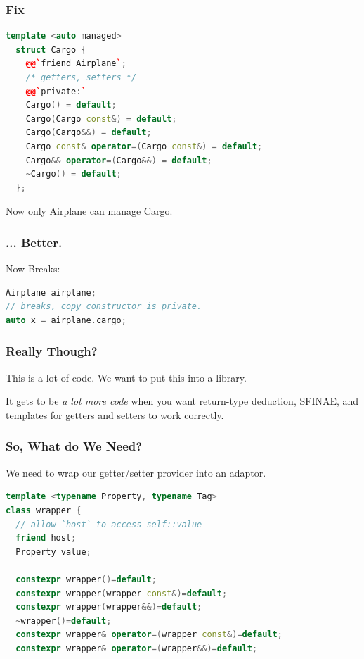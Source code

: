 \documentclass{beamer}
\newcommand{\nl}{\vspace{0.2\baselineskip}}
\begin{document}
\begin{frame}[fragile]
\frametitle{Fix}
\begin{lstlisting}[language=cpp]
  template <auto managed>
  struct Cargo {
    @@`friend Airplane`;
    /* getters, setters */
    @@`private:`
    Cargo() = default;
    Cargo(Cargo const&) = default;
    Cargo(Cargo&&) = default;
    Cargo const& operator=(Cargo const&) = default;
    Cargo&& operator=(Cargo&&) = default;
    ~Cargo() = default;
  };
\end{lstlisting}
\begin{center}
  Now only Airplane can manage Cargo.
\end{center}
\end{frame}


\begin{frame}[fragile]
\frametitle{... Better.}
\begin{center}
  Now Breaks:
\end{center}

\begin{lstlisting}[language=cpp]
Airplane airplane;
// breaks, copy constructor is private.
auto x = airplane.cargo;
\end{lstlisting}
\end{frame}

\begin{frame}[fragile]
\frametitle{Really Though?}
\begin{center}
  This is a lot of code. We want to put this into a library.\nl \nl \nl \nl

  It gets to be \emph{a lot more code} when you want return-type deduction,
  SFINAE, and templates for getters and setters to work correctly.
\end{center}
\end{frame}

\begin{frame}[fragile]
\frametitle{So, What do We Need?}
\begin{center}
  We need to wrap our getter/setter provider into an adaptor.
\end{center}
\begin{lstlisting}[language=cpp]
template <typename Property, typename Tag>
class wrapper {
  // allow `host` to access self::value
  friend host;
  Property value;

  constexpr wrapper()=default;
  constexpr wrapper(wrapper const&)=default;
  constexpr wrapper(wrapper&&)=default;
  ~wrapper()=default;
  constexpr wrapper& operator=(wrapper const&)=default;
  constexpr wrapper& operator=(wrapper&&)=default;
\end{lstlisting}
\end{frame}
\end{document}
